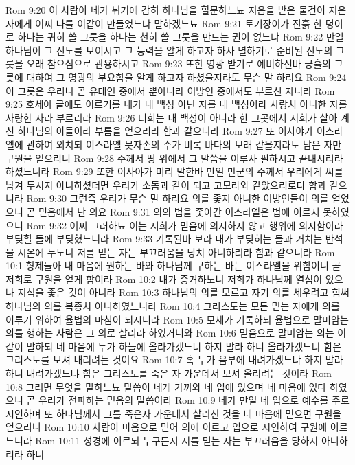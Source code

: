 Rom 9:20  이 사람아 네가 뉘기에 감히 하나님을 힐문하느뇨 지음을 받은 물건이 지은 자에게 어찌 나를 이같이 만들었느냐 말하겠느뇨
Rom 9:21  토기장이가 진흙 한 덩이로 하나는 귀히 쓸 그릇을 하나는 천히 쓸 그릇을 만드는 권이 없느냐
Rom 9:22  만일 하나님이 그 진노를 보이시고 그 능력을 알게 하고자 하사 멸하기로 준비된 진노의 그릇을 오래 참으심으로 관용하시고
Rom 9:23  또한 영광 받기로 예비하신바 긍휼의 그릇에 대하여 그 영광의 부요함을 알게 하고자 하셨을지라도 무슨 말 하리요
Rom 9:24  이 그릇은 우리니 곧 유대인 중에서 뿐아니라 이방인 중에서도 부르신 자니라
Rom 9:25  호세아 글에도 이르기를 내가 내 백성 아닌 자를 내 백성이라 사랑치 아니한 자를 사랑한 자라 부르리라
Rom 9:26  너희는 내 백성이 아니라 한 그곳에서 저희가 살아 계신 하나님의 아들이라 부름을 얻으리라 함과 같으니라
Rom 9:27  또 이사야가 이스라엘에 관하여 외치되 이스라엘 뭇자손의 수가 비록 바다의 모래 같을지라도 남은 자만 구원을 얻으리니
Rom 9:28  주께서 땅 위에서 그 말씀을 이루사 필하시고 끝내시리라 하셨느니라
Rom 9:29  또한 이사야가 미리 말한바 만일 만군의 주께서 우리에게 씨를 남겨 두시지 아니하셨더면 우리가 소돔과 같이 되고 고모라와 같았으리로다 함과 같으니라
Rom 9:30  그런즉 우리가 무슨 말 하리요 의를 좇지 아니한 이방인들이 의를 얻었으니 곧 믿음에서 난 의요
Rom 9:31  의의 법을 좇아간 이스라엘은 법에 이르지 못하였으니
Rom 9:32  어찌 그러하뇨 이는 저희가 믿음에 의지하지 않고 행위에 의지함이라 부딪힐 돌에 부딪혔느니라
Rom 9:33  기록된바 보라 내가 부딪히는 돌과 거치는 반석을 시온에 두노니 저를 믿는 자는 부끄러움을 당치 아니하리라 함과 같으니라
Rom 10:1  형제들아 내 마음에 원하는 바와 하나님께 구하는 바는 이스라엘을 위함이니 곧 저희로 구원을 얻게 함이라
Rom 10:2  내가 증거하노니 저희가 하나님께 열심이 있으나 지식을 좇은 것이 아니라
Rom 10:3  하나님의 의를 모르고 자기 의를 세우려고 힘써 하나님의 의를 복종치 아니하였느니라
Rom 10:4  그리스도는 모든 믿는 자에게 의를 이루기 위하여 율법의 마침이 되시니라
Rom 10:5  모세가 기록하되 율법으로 말미암는 의를 행하는 사람은 그 의로 살리라 하였거니와
Rom 10:6  믿음으로 말미암는 의는 이같이 말하되 네 마음에 누가 하늘에 올라가겠느냐 하지 말라 하니 올라가겠느냐 함은 그리스도를 모셔 내리려는 것이요
Rom 10:7  혹 누가 음부에 내려가겠느냐 하지 말라 하니 내려가겠느냐 함은 그리스도를 죽은 자 가운데서 모셔 올리려는 것이라
Rom 10:8  그러면 무엇을 말하느뇨 말씀이 네게 가까와 네 입에 있으며 네 마음에 있다 하였으니 곧 우리가 전파하는 믿음의 말씀이라
Rom 10:9  네가 만일 네 입으로 예수를 주로 시인하며 또 하나님께서 그를 죽은자 가운데서 살리신 것을 네 마음에 믿으면 구원을 얻으리니
Rom 10:10  사람이 마음으로 믿어 의에 이르고 입으로 시인하여 구원에 이르느니라
Rom 10:11  성경에 이르되 누구든지 저를 믿는 자는 부끄러움을 당하지 아니하리라 하니
